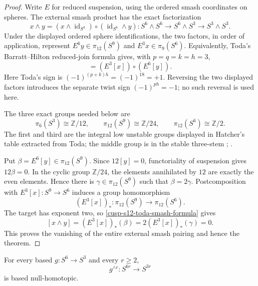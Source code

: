 \begin{proof}
Write \(E\) for reduced suspension, using the ordered smash coordinates on
spheres.  The external smash product has the exact factorization
\begin{equation}
 x\wedge y
 =
 (x\wedge\operatorname{id}_{S^3})
 \circ
 (\operatorname{id}_{S^6}\wedge y):
 S^6\wedge S^6\longrightarrow S^6\wedge S^3
 \longrightarrow S^3\wedge S^3.
 \label{cusp-s12-smash-factorization}
\end{equation}
Under the displayed ordered sphere identifications, the two factors, in
order of application, represent \(E^6y\in\pi_{12}(S^9)\) and
\(E^3x\in\pi_9(S^6)\).  Equivalently, Toda's
Barratt--Hilton reduced-join formula gives, with
\(p=q=k=h=3\),
\begin{equation}
 [x\wedge y]=(E^3[x])\circ(E^6[y]).
 \label{cusp-s12-toda-smash-formula}
\end{equation}
Here Toda's sign is \((-1)^{(p+k)h}=(-1)^{18}=+1\).  Reversing the
two displayed factors introduces the separate twist sign
\((-1)^{ph}=-1\); no such reversal is used here.

The three exact groups needed below are
\begin{equation}
 \pi_6(S^3)\cong\mathbb Z/12,
 \qquad
 \pi_{12}(S^9)\cong\mathbb Z/24,
 \qquad
 \pi_{12}(S^6)\cong\mathbb Z/2.
 \label{cusp-s12-three-stem-groups}
\end{equation}
The first and third are the integral low unstable groups displayed in
Hatcher's table extracted from Toda; the middle group is in the stable
three-stem
\cite[opening table, p.~339]{Hatcher2002};
\cite[Table~1, p.~113]{IsaksenWangXu2023}.

Put \(\beta=E^6[y]\in\pi_{12}(S^9)\).  Since
\(12[y]=0\), functoriality of suspension gives \(12\beta=0\).  In the
cyclic group \(\mathbb Z/24\), the elements annihilated by \(12\) are
exactly the even elements.  Hence there is
\(\gamma\in\pi_{12}(S^9)\) such that \(\beta=2\gamma\).
Postcomposition with \(E^3[x]:S^9\to S^6\) induces a group homomorphism
\[
 (E^3[x])_*:\pi_{12}(S^9)\longrightarrow\pi_{12}(S^6).
\]
The target has exponent two, so \cref{cusp-s12-toda-smash-formula} gives
\[
 [x\wedge y]
 =(E^3[x])_*(\beta)
 =2(E^3[x])_*(\gamma)
 =0.
\]
This proves the vanishing of the entire external smash pairing and hence
the theorem.
\end{proof}

\begin{corollary}
\label{cusp-s12-all-higher-smashes-null}
For every based \(g:S^6\to S^3\) and every \(r\geq2\),
\[
 g^{\wedge r}:S^{6r}\longrightarrow S^{3r}
\]
is based null-homotopic.
\end{corollary}


